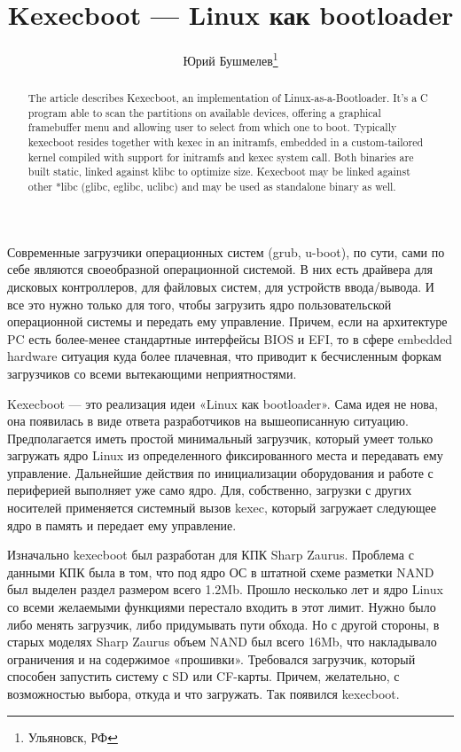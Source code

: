 \documentclass[10pt, a5paper]{article}
\begin{document}
\title{Kexecboot --- Linux как bootloader}%

\author{Юрий Бушмелев\footnote{Ульяновск, РФ}}
\maketitle

\begin{abstract}
The article describes Kexecboot, an implementation of Linux-as-a-Bootloader. It's a C program able to scan the partitions on available devices, offering a graphical framebuffer menu and allowing user to select from which one to boot.
Typically \linebreak kexecboot resides together with kexec in an initramfs, embedded in a custom-tailored kernel compiled with support for initramfs and kexec system call. Both binaries are built static, linked against klibc to optimize size. Kexecboot may be linked against other *libc (glibc, eglibc, uclibc) and may be used as standalone binary as well.
\end{abstract}

Современные загрузчики операционных систем (grub, u-boot), по сути, сами по себе являются своеобразной операционной системой. В них есть драйвера для дисковых контроллеров, для файловых систем, для устройств ввода/вывода. И все это нужно только для того, чтобы загрузить ядро пользовательской операционной системы и передать ему управление. Причем, если на архитектуре PC есть более-менее стандартные интерфейсы BIOS и EFI, то в сфере embedded hardware ситуация куда более плачевная, что приводит к бесчисленным форкам загрузчиков со всеми вытекающими неприятностями.

Kexecboot --- это реализация идеи «Linux как bootloader». Сама идея не нова, она появилась в виде ответа разработчиков на вышеописанную ситуацию. Предполагается иметь простой минимальный загрузчик, который умеет только загружать ядро Linux из определенного фиксированного места и передавать ему управление. Дальнейшие действия по инициализации оборудования и работе с периферией выполняет уже само ядро. Для, собственно, загрузки с других носителей применяется системный вызов kexec, который загружает следующее ядро в память и передает ему управление.

Изначально kexecboot был разработан для КПК Sharp Zaurus. Проблема с данными КПК была в том, что под ядро ОС в штатной схеме разметки NAND был выделен раздел размером всего 1.2Mb. Прошло несколько лет и ядро Linux со всеми желаемыми функциями перестало входить в этот лимит. Нужно было либо менять загрузчик, либо придумывать пути обхода. Но с другой стороны, в старых моделях Sharp Zaurus объем NAND был всего 16Mb, что накладывало ограничения и на содержимое «прошивки». Требовался загрузчик, который способен запустить систему с SD или CF-карты. Причем, желательно, с возможностью выбора, откуда и что загружать. Так появился kexecboot.
\end{document}
